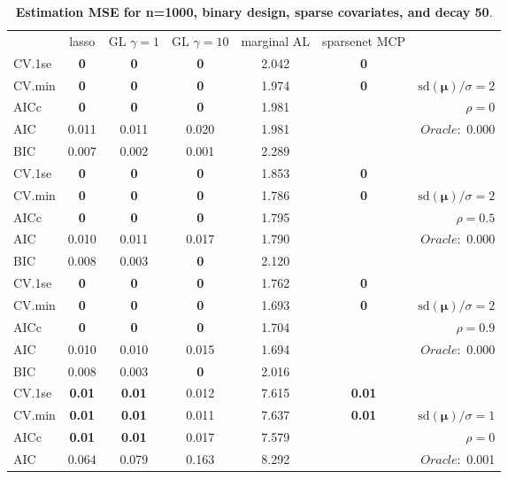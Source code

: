 \clearpage
\begin{table}\vspace{-.5cm}
\caption[l]{ { \bf Estimation MSE for n=1000, binary design, 
sparse covariates, and  decay  50}.}
\vspace{-.5cm}
\footnotesize{}
\begin{center}
\begin{tabular}{l*{5}{c}|r}
& lasso & GL $\gamma=1$ & GL $\gamma=10$ & marginal AL & sparsenet MCP  & \\
 \cline{1-7}
CV.1se & {\bf 0} & {\bf 0} & {\bf 0} & 2.042 & {\bf 0} & \\
CV.min & {\bf 0} & {\bf 0} & {\bf 0} & 1.974 & {\bf 0} &  $\mathrm{sd}(\mathbf{\mu})/\sigma=2$ \\
AICc & {\bf 0} & {\bf 0} & {\bf 0} & 1.981 & & $\rho=0$ \\
AIC & 0.011 & 0.011 & 0.020 & 1.981 & &  \multirow{2}{*}{$Oracle: $ 0.000} \\
BIC & 0.007 & 0.002 & 0.001 & 2.289 & &  \\
 \hline 
CV.1se & {\bf 0} & {\bf 0} & {\bf 0} & 1.853 & {\bf 0} & \\
CV.min & {\bf 0} & {\bf 0} & {\bf 0} & 1.786 & {\bf 0} &  $\mathrm{sd}(\mathbf{\mu})/\sigma=2$ \\
AICc & {\bf 0} & {\bf 0} & {\bf 0} & 1.795 & & $\rho=0.5$ \\
AIC & 0.010 & 0.011 & 0.017 & 1.790 & &  \multirow{2}{*}{$Oracle: $ 0.000} \\
BIC & 0.008 & 0.003 & {\bf 0} & 2.120 & &  \\
 \hline 
CV.1se & {\bf 0} & {\bf 0} & {\bf 0} & 1.762 & {\bf 0} & \\
CV.min & {\bf 0} & {\bf 0} & {\bf 0} & 1.693 & {\bf 0} &  $\mathrm{sd}(\mathbf{\mu})/\sigma=2$ \\
AICc & {\bf 0} & {\bf 0} & {\bf 0} & 1.704 & & $\rho=0.9$ \\
AIC & 0.010 & 0.010 & 0.015 & 1.694 & &  \multirow{2}{*}{$Oracle: $ 0.000} \\
BIC & 0.008 & 0.003 & {\bf 0} & 2.016 & &  \\
 \hline 
CV.1se & {\bf 0.01} & {\bf 0.01} & 0.012 & 7.615 & {\bf 0.01} & \\
CV.min & {\bf 0.01} & {\bf 0.01} & 0.011 & 7.637 & {\bf 0.01} &  $\mathrm{sd}(\mathbf{\mu})/\sigma=1$ \\
AICc & {\bf 0.01} & {\bf 0.01} & 0.017 & 7.579 & & $\rho=0$ \\
AIC & 0.064 & 0.079 & 0.163 & 8.292 & &  \multirow{2}{*}{$Oracle: $ 0.001} \\

\end{tabular}
\end{center}
\end{table}
